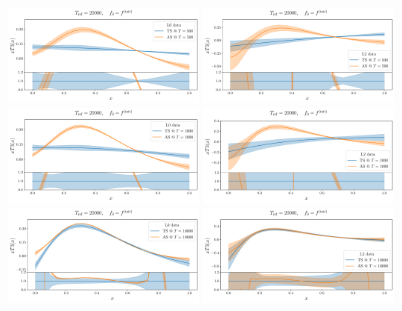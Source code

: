   \begin{figure}[ht!]
    \centering
    \includegraphics[width=0.45\textwidth]{plots/analytical_solution/evolution/evolution_vs_trained_epoch_500_L0.pdf} \hspace{10mm}
    \includegraphics[width=0.45\textwidth]{plots/analytical_solution/evolution/evolution_vs_trained_epoch_500_L2.pdf}
    \includegraphics[width=0.45\textwidth]{plots/analytical_solution/evolution/evolution_vs_trained_epoch_1000_L0.pdf} \hspace{10mm}
    \includegraphics[width=0.45\textwidth]{plots/analytical_solution/evolution/evolution_vs_trained_epoch_1000_L2.pdf}
    \includegraphics[width=0.45\textwidth]{plots/analytical_solution/evolution/evolution_vs_trained_epoch_10000_L0.pdf} \hspace{10mm}
    \includegraphics[width=0.45\textwidth]{plots/analytical_solution/evolution/evolution_vs_trained_epoch_10000_L2.pdf}

\end{figure}
